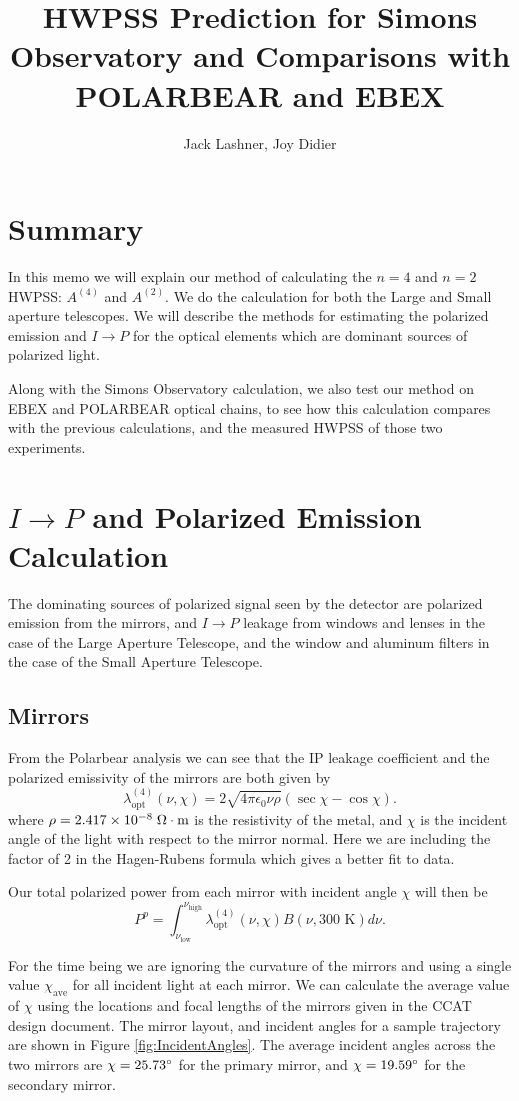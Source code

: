 \documentclass{article}
\title{HWPSS Prediction for Simons Observatory and Comparisons with POLARBEAR and EBEX}
\author{Jack Lashner, Joy Didier}
\theoremstyle{remark}
\newcommand{\tab}{\hspace*{2em}}
\renewcommand{\t}[1]{\text{#1}}
\newcommand{\A}[1]{A^{(#1)}}
\newcommand{\lo}{\lambda_\t{opt}^{(4)}}
\newcommand{\ip}{$I\rightarrow P$ }
\begin{document}
\maketitle
\section*{Summary}
\tab In this memo we will explain our method of calculating the $n=4$ and $n=2$ HWPSS: $\A4$ and $\A2$. 
We do the calculation for both the Large and Small aperture telescopes. 
We will describe the methods for estimating the polarized emission and \ip for the optical elements which are dominant sources of polarized light.

Along with the Simons Observatory calculation, we also test our method on EBEX and POLARBEAR optical chains,
to see how this calculation compares with the previous calculations, and the measured HWPSS of those two experiments.

\section{\ip and Polarized Emission Calculation}

The dominating sources of polarized signal seen by the detector are polarized emission from the mirrors, and $I\rightarrow P$ leakage from windows and lenses in the case of the Large Aperture Telescope,
and the window and aluminum filters in the case of the Small Aperture Telescope.


\subsection{Mirrors}
\tab From the Polarbear analysis \cite{takakura_performance_2017}  we can see that the IP leakage coefficient and the polarized emissivity of the mirrors are both given by
\[\lo(\nu, \chi) = 2 \sqrt{4 \pi \epsilon_0 \nu \rho} (\sec\chi - \cos\chi).\]
where $\rho = 2.417\times 10^{-8} \; \ohm \cdot \t{m}$ is the resistivity of the metal, and $\chi$ is the incident angle of the light with respect to the mirror normal.
Here we are including the factor of 2 in the Hagen-Rubens formula which gives a better fit to data.

\tab Our total polarized power from each mirror with incident angle $\chi$ will then be
\[
P^{p} = \int_{\nu_\t{low}}^{\nu_\t{high}} \lo(\nu, \chi) B(\nu, 300 \t{ K}) d\nu.
\]

\tab For the time being we are ignoring the curvature of the mirrors and using a single value $\chi_\t{ave}$ for all incident light at each mirror.
We can calculate the average value of $\chi$ using the locations and focal lengths of the mirrors given in the CCAT design document. The mirror layout, and incident angles for a sample trajectory are shown in Figure \ref{fig:IncidentAngles}.
The average incident angles across the two mirrors are $\chi = 25.73 \degree$ for the primary mirror, and $\chi = 19.59\degree$ for the secondary mirror.
\end{document}
